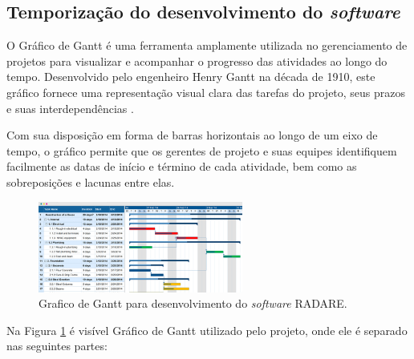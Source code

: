 \subsection{Temporização do desenvolvimento do \textit{software}}

O Gráfico de Gantt é uma ferramenta amplamente utilizada no gerenciamento de projetos para visualizar e acompanhar o progresso das atividades ao longo do tempo. Desenvolvido pelo engenheiro Henry Gantt na década de 1910, este gráfico fornece uma representação visual clara das tarefas do projeto, seus prazos e suas interdependências \cite{ganttchart}. 

Com sua disposição em forma de barras horizontais ao longo de um eixo de tempo, o gráfico permite que os gerentes de projeto e suas equipes identifiquem facilmente as datas de início e término de cada atividade, bem como as sobreposições e lacunas entre elas.
    
\begin{figure}[h]
    \centering
    \includegraphics[width=0.6\textwidth]{figuras/gantt-chart.jpg} %
    \caption{Grafico de Gantt para desenvolvimento do \textit{software} RADARE.}
    \label{fig:ganttChart}
\end{figure}    

Na Figura \ref{fig:ganttChart} é visível Gráfico de Gantt utilizado pelo projeto, onde ele é separado nas seguintes partes: 
    
